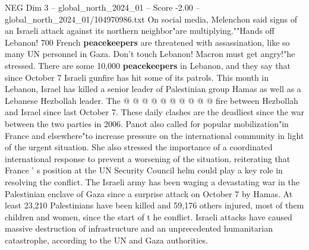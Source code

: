 \begin{textsample}{NEG Dim 3 – global\_north\_2024\_01 – Score -2.00 – global\_north\_2024\_01/104970986.txt}
On social media, Melenchon said signs of an Israeli attack against its northern neighbor"are multiplying.""Hands off Lebanon! 700 French \textbf{peacekeepers} are threatened with assassination, like so many UN personnel in Gaza.
Don't touch Lebanon!
Macron must get angry!"he stressed.
There are some 10,000 \textbf{peacekeepers} in Lebanon, and they say that since October 7 Israeli gunfire has hit some of its patrols.
This month in Lebanon, Israel has killed a senior leader of Palestinian group Hamas as well as a Lebanese Hezbollah leader.
The @ @ @ @ @ @ @ @ @ @ fire between Hezbollah and Israel since last October 7.
These daily clashes are the deadliest since the war between the two parties in 2006.
Panot also called for popular mobilization"in France and elsewhere"to increase pressure on the international community in light of the urgent situation.
She also stressed the importance of a coordinated international response to prevent a worsening of the situation, reiterating that France ' s position at the UN Security Council helm could play a key role in resolving the conflict.
The Israeli army has been waging a devastating war in the Palestinian enclave of Gaza since a surprise attack on October 7 by Hamas.
At least 23,210 Palestinians have been killed and 59,176 others injured, most of them children and women, since the start of t he conflict.
Israeli attacks have caused massive destruction of infrastructure and an unprecedented humanitarian catastrophe, according to the UN and Gaza authorities.

\end{textsample}
